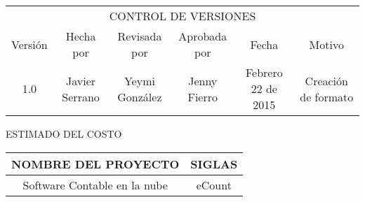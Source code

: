 %
\begin{table}[H]
	\centering
	\begin{tabular}{| c | c | c | c | c | c | }
	\hline
	\multicolumn{6}{c}{CONTROL DE VERSIONES} \\
	\cline{1-6}\noalign{\smallskip}
	\hline
	Versi\'on & Hecha por & Revisada por & Aprobada por & Fecha & Motivo \\ \hline
	 1.0 & Javier Serrano & Yeymi Gonz\'alez & Jenny Fierro & Febrero 22 de 2015 & Creaci\'on de formato \\
	\hline
	\end{tabular}
\end{table}
%
\begin{center}
	\huge{ESTIMADO DEL COSTO}
\end{center}
%
\begin{table}[H]
	\centering
	\begin{tabular}{| c | c |}
	\hline
	\textbf{NOMBRE DEL PROYECTO} & \textbf{SIGLAS} \\
	\hline
	Software Contable en la nube & eCount \\
	\hline
	\end{tabular}
\end{table}
%